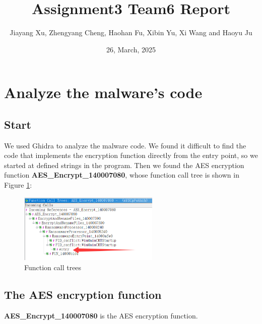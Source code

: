 \documentclass[11pt]{article}
\begin{document}
\title{Assignment3 Team6 Report}
\author{Jiayang Xu, Zhengyang Cheng, Haohan Fu, Xibin Yu, Xi Wang and Haoyu Ju}
\date{26, March, 2025}
\maketitle

\section{Analyze the malware's code}
\subsection{Start}
We used Ghidra to analyze the malware code. We found it difficult to find the code that implements the encryption function directly from the entry point, so we started at defined strings in the program. Then we found the AES encryption function \textbf{AES\_Encrypt\_140007080}, whose function call tree is shown in Figure \ref{Call Trees}:

\begin{figure}[htbp]
    \centering
    \includegraphics[width=0.6\textwidth]{img/Call Trees.png}
    \caption{Function call trees}
    \label{Call Trees}
\end{figure}

\subsection{The AES encryption function}
\textbf{AES\_Encrypt\_140007080} is the AES encryption function.
\end{document}
